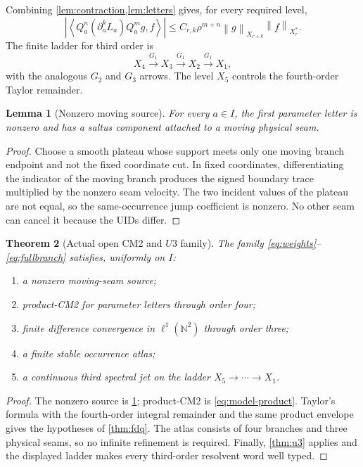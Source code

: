\documentclass[11pt,reqno]{amsart}
\newtheorem{theorem}{Theorem}[section]
\newtheorem{lemma}[theorem]{Lemma}
\theoremstyle{definition}
\theoremstyle{remark}
\newcommand{\N}{\mathbb N}
\newcommand{\norm}[1]{\left\lVert #1\right\rVert}
\newcommand{\abs}[1]{\left\lvert #1\right\rvert}
\newcommand{\pair}[2]{\left\langle #1,#2\right\rangle}
\begin{document}
Combining \cref{lem:contraction,lem:letters} gives, for every required level,
\begin{equation}\label{eq:model-product}
 \abs{\pair{Q_a^n(\partial_a^kL_a)Q_a^m g}{f}}
 \le C_{r,k}\rho^{m+n}
 \norm{g}_{X_{r+k}}\norm{f}_{X_r^*}.
\end{equation}
The finite ladder for third order is
\[
 X_4\xrightarrow{G_1}X_3\xrightarrow{G_1}X_2
 \xrightarrow{G_1}X_1,
\]
with the analogous $G_2$ and $G_3$ arrows.  The level $X_5$ controls the
fourth-order Taylor remainder.

\begin{lemma}[Nonzero moving source]\label{lem:nonzero}
For every $a\in I$, the first parameter letter is nonzero and has a saltus
component attached to a moving physical seam.
\end{lemma}

\begin{proof}
Choose a smooth plateau whose support meets only one moving branch endpoint
and not the fixed coordinate cut.  In fixed coordinates, differentiating the
indicator of the moving branch produces the signed boundary trace multiplied
by the nonzero seam velocity.  The two incident values of the plateau are not
equal, so the same-occurrence jump coefficient is nonzero.  No other seam can
cancel it because the UIDs differ.
\end{proof}

\begin{theorem}[Actual open CM2 and $U3$ family]\label{thm:fourbranch}
The family \eqref{eq:weights}--\eqref{eq:fullbranch} satisfies, uniformly on
$I$:
\begin{enumerate}[label=\textup{(\roman*)}]
\item a nonzero moving-seam source;
\item product-CM2 for parameter letters through order four;
\item finite difference convergence in $\ell^1(\N^2)$ through order three;
\item a finite stable occurrence atlas;
\item a continuous third spectral jet on the ladder $X_5\to\cdots\to X_1$.
\end{enumerate}
\end{theorem}

\begin{proof}
The nonzero source is \cref{lem:nonzero}; product-CM2 is
\eqref{eq:model-product}.  Taylor's formula with the fourth-order integral
remainder and the same product envelope gives the hypotheses of
\cref{thm:fdq}.  The atlas consists of four branches and three physical seams,
so no infinite refinement is required.  Finally, \cref{thm:u3} applies and the
displayed ladder makes every third-order resolvent word well typed.
\end{proof}
\end{document}
